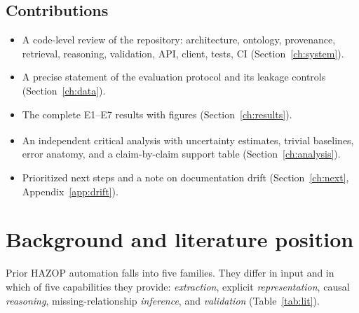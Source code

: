\documentclass[10pt,twocolumn,a4paper]{extarticle}
\newcommand{\derived}{\textsuperscript{\textdagger}}
\begin{document}
\subsection{Contributions}
\begin{itemize}
  \item A code-level review of the repository: architecture, ontology, provenance, retrieval, reasoning, validation, API, client, tests, CI (Section~\ref{ch:system}).
  \item A precise statement of the evaluation protocol and its leakage controls (Section~\ref{ch:data}).
  \item The complete E1--E7 results with figures (Section~\ref{ch:results}).
  \item An independent critical analysis\derived{} with uncertainty estimates, trivial baselines, error anatomy, and a claim-by-claim support table (Section~\ref{ch:analysis}).
  \item Prioritized next steps and a note on documentation drift (Section~\ref{ch:next}, Appendix~\ref{app:drift}).
\end{itemize}

\section{Background and literature position}\label{ch:lit}

Prior HAZOP automation falls into five families. They differ in input and in which of five capabilities they provide: \emph{extraction}, explicit \emph{representation}, causal \emph{reasoning}, missing-relationship \emph{inference}, and \emph{validation} (Table~\ref{tab:lit}).
\end{document}

